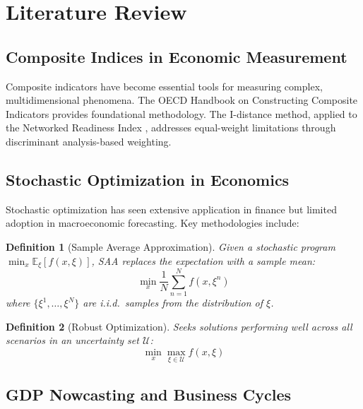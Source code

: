 \documentclass[12pt,a4paper]{article}
\newtheorem{definition}{Definition}
\newcommand{\E}{\mathbb{E}}
\begin{document}
\section{Literature Review}

\subsection{Composite Indices in Economic Measurement}

Composite indicators have become essential tools for measuring complex, multidimensional phenomena. The OECD Handbook on Constructing Composite Indicators \citep{nardo2005handbook} provides foundational methodology. The I-distance method, applied to the Networked Readiness Index \citep{jovanovic2016idistance}, addresses equal-weight limitations through discriminant analysis-based weighting.

\subsection{Stochastic Optimization in Economics}

Stochastic optimization has seen extensive application in finance but limited adoption in macroeconomic forecasting. Key methodologies include:

\begin{definition}[Sample Average Approximation]
Given a stochastic program $\min_x \E_\xi[f(x,\xi)]$, SAA replaces the expectation with a sample mean:
\begin{equation}
    \min_x \frac{1}{N}\sum_{n=1}^{N} f(x, \xi^n)
\end{equation}
where $\{\xi^1, \ldots, \xi^N\}$ are i.i.d.\ samples from the distribution of $\xi$.
\end{definition}

\begin{definition}[Robust Optimization]
Seeks solutions performing well across all scenarios in an uncertainty set $\mathcal{U}$:
\begin{equation}
    \min_x \max_{\xi \in \mathcal{U}} f(x, \xi)
\end{equation}
\end{definition}

\subsection{GDP Nowcasting and Business Cycles}
\end{document}

